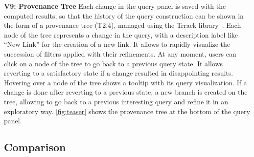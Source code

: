 
\noindent\textbf{V9: Provenance Tree}
Each change in the query panel is saved with the computed results, so that the history of the query construction can be shown in the form of a provenance tree (T2.4), managed using the Trrack library~\cite{cutler_trrack_2020}. Each node of the tree represents a change in the query, with a description label like ``New Link'' for the creation of a new link. It allows to rapidly visualize the succession of filters applied with their refinements. At any moment, users can click on a node of the tree to go back to a previous query state. It allows reverting to a satisfactory state if a change resulted in disappointing results. Hovering over a node of the tree shows a tooltip with its query visualization. If a change is done after reverting to a previous state, a new branch is created on the tree, allowing to go back to a previous interesting query and refine it in an exploratory way.  \autoref{fig:teaser} shows the provenance tree at the bottom of the query panel.




\subsection{Comparison}


